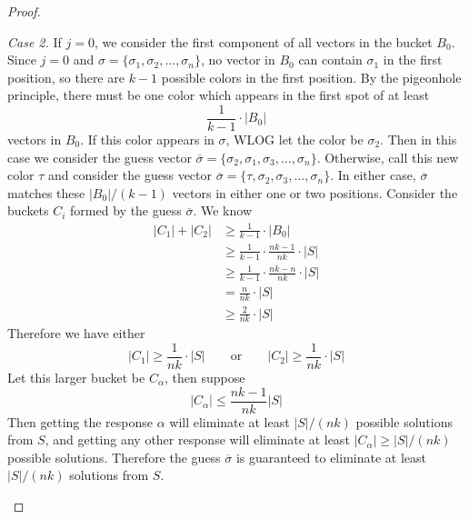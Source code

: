 \documentclass[12pt, a4paper]{article}
\begin{document}
\begin{enumerate}
\begin{proof}
\begin{enumerate}[label=]
			\textit{Case 2.} If $j=0$, we consider the first component of all vectors
			in the bucket $B_0$. Since $j=0$ and $\sigma=\{\sigma_1, \sigma_2, \ldots,
			\sigma_n\}$, no vector in $B_0$ can contain $\sigma_1$ in the first
			position, so there are $k-1$ possible colors in the first position. By
			the pigeonhole principle, there must be one color which appears in the
			first spot of at least
				\begin{equation*}
				\frac{1}{k-1}\cdot|B_0|
				\end{equation*}
			vectors in $B_0$. If this color appears in $\sigma$, WLOG
			let the color be $\sigma_2$. Then in this case we consider the guess vector
			$\overline{\sigma}=\{\sigma_2, \sigma_1, \sigma_3, \ldots, \sigma_n\}$.
			Otherwise, call this new color $\tau$ and consider the guess vector
			$\overline{\sigma}=\{\tau, \sigma_2, \sigma_3, \ldots, \sigma_n\}$.
			In either case, $\overline{\sigma}$ matches these $|B_0|/(k-1)$ vectors
			in either one or two positions. Consider the
			buckets $C_i$ formed by the guess $\overline{\sigma}$. We know
				\begin{align*}
				|C_1|+|C_2| & \ge \frac{1}{k-1}\cdot |B_0|\\
				& \ge \frac{1}{k-1}\cdot\frac{nk-1}{nk}\cdot|S|\\
				& \ge \frac{1}{k-1}\cdot\frac{nk-n}{nk}\cdot|S|\\
				& = \frac{n}{nk}\cdot|S|\\
				& \ge \frac{2}{nk}\cdot|S|
				\end{align*}
			Therefore we have either
				\begin{equation*}
				|C_1|\ge\frac{1}{nk}\cdot|S|\qquad\text{or}
				\qquad|C_2|\ge\frac{1}{nk}\cdot|S|
				\end{equation*}
			Let this larger bucket be $C_{\alpha}$, then suppose
			\begin{equation*}|C_{\alpha}|\le\frac{nk-1}{nk}|S|\end{equation*}
			Then getting the response $\alpha$ will eliminate at least $|S|/(nk)$
			possible solutions from $S$, and getting any other response will
			eliminate at least $|C_\alpha|\ge |S|/(nk)$ possible solutions. Therefore
			the guess $\overline{\sigma}$ is guaranteed to eliminate at least
			$|S|/(nk)$ solutions from $S$.
			

\end{enumerate}
\end{proof}
\end{enumerate}
\end{document}

